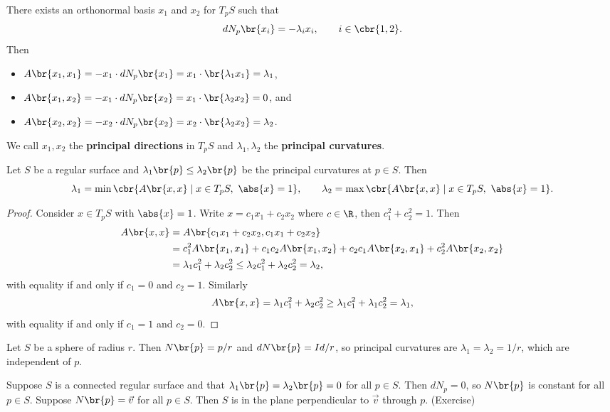 
There exists an orthonormal basis $ x_1 $ and $ x_2 $ for $ T_pS $ such that
$$ dN_p\br{x_i} = -\lambda_ix_i, \qquad i \in \cbr{1, 2}. $$
Then
\begin{itemize}
\item $ A\br{x_1, x_1} = -x_1 \cdot dN_p\br{x_1} = x_1 \cdot \br{\lambda_1x_1} = \lambda_1 $,
\item $ A\br{x_1, x_2} = -x_1 \cdot dN_p\br{x_2} = x_1 \cdot \br{\lambda_2x_2} = 0 $, and
\item $ A\br{x_2, x_2} = -x_2 \cdot dN_p\br{x_2} = x_2 \cdot \br{\lambda_2x_2} = \lambda_2 $.
\end{itemize}
We call $ x_1, x_2 $ the \textbf{principal directions} in $ T_pS $ and $ \lambda_1, \lambda_2 $ the \textbf{principal curvatures}.

\begin{lemma}
Let $ S $ be a regular surface and $ \lambda_1\br{p} \le \lambda_2\br{p} $ be the principal curvatures at $ p \in S $. Then
$$ \lambda_1 = \min\cbr{A\br{x, x} \mid x \in T_pS, \ \abs{x} = 1}, \qquad \lambda_2 = \max\cbr{A\br{x, x} \mid x \in T_pS, \ \abs{x} = 1}. $$
\end{lemma}

\begin{proof}
Consider $ x \in T_pS $ with $ \abs{x} = 1 $. Write $ x = c_1x_1 + c_2x_2 $ where $ c \in \R $, then $ c_1^2 + c_2^2 = 1 $. Then
\begin{align*}
A\br{x, x}
& = A\br{c_1x_1 + c_2x_2, c_1x_1 + c_2x_2} \\
& = c_1^2A\br{x_1, x_1} + c_1c_2A\br{x_1, x_2} + c_2c_1A\br{x_2, x_1} + c_2^2A\br{x_2, x_2} \\
& = \lambda_1c_1^2 + \lambda_2c_2^2 \le \lambda_2c_1^2 + \lambda_2c_2^2 = \lambda_2,
\end{align*}
with equality if and only if $ c_1 = 0 $ and $ c_2 = 1 $. Similarly
$$ A\br{x, x} = \lambda_1c_1^2 + \lambda_2c_2^2 \ge \lambda_1c_1^2 + \lambda_1c_2^2 = \lambda_1, $$
with equality if and only if $ c_1 = 1 $ and $ c_2 = 0 $.
\end{proof}

\begin{example*}
Let $ S $ be a sphere of radius $ r $. Then $ N\br{p} = p / r $ and $ dN\br{p} = Id / r $, so principal curvatures are $ \lambda_1 = \lambda_2 = 1 / r $, which are independent of $ p $.
\end{example*}

\begin{example*}
Suppose $ S $ is a connected regular surface and that $ \lambda_1\br{p} = \lambda_2\br{p} = 0 $ for all $ p \in S $. Then $ dN_p = 0 $, so $ N\br{p} $ is constant for all $ p \in S $. Suppose $ N\br{p} = \vec{v} $ for all $ p \in S $. Then $ S $ is in the plane perpendicular to $ \vec{v} $ through $ p $. (Exercise)
\end{example*}

